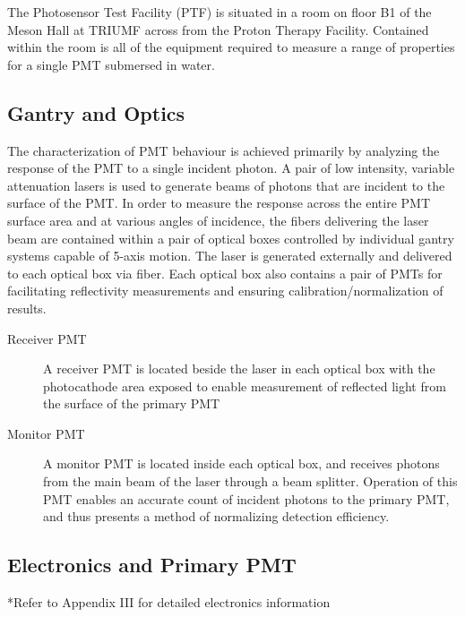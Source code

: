 \documentclass[journal]{IEEEtran}
\begin{document}
The Photosensor Test Facility (PTF) is situated in a room on floor B1 of the Meson Hall at TRIUMF across from the Proton Therapy Facility. Contained within the room is all of the equipment required to measure a range of properties for a single PMT submersed in water.

\subsection{Gantry and Optics}
The characterization of PMT behaviour is achieved primarily by analyzing the response of the PMT to a single incident photon. A pair of low intensity, variable attenuation lasers is used to generate beams of photons that are incident to the surface of the PMT. In order to measure the response across the entire PMT surface area and at various angles of incidence, the fibers delivering the laser beam are contained within a pair of optical boxes controlled by individual gantry systems capable of 5-axis motion. The laser is generated externally and delivered to each optical box via fiber. Each optical box also contains a pair of PMTs for facilitating reflectivity measurements and ensuring calibration/normalization of results.

\begin{description}
\item [Receiver PMT] A receiver PMT is located beside the laser in each optical box with the photocathode area exposed to enable measurement of reflected light from the surface of the primary PMT
\vskip 0.05in
\item [Monitor PMT] A monitor PMT is located inside each optical box, and receives photons from the main beam of the laser through a beam splitter. Operation of this PMT enables an accurate count of incident photons to the primary PMT, and thus presents a method of normalizing detection efficiency.
\end{description}

%	

\subsection{Electronics and Primary PMT} 

*Refer to Appendix III for detailed electronics information
\end{document}
